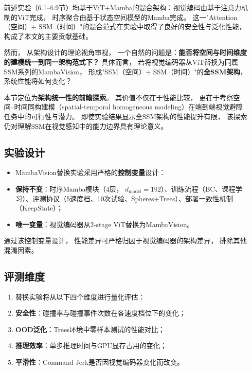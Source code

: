 前述实验（6.1--6.9节）均基于ViT+Mamba的混合架构：视觉编码由基于注意力机制的ViT完成，
时序聚合由基于状态空间模型的Mamba完成。
这一"Attention（空间）+ SSM（时间）"的混合范式在实验中取得了良好的安全性与泛化性能，
构成了本文的主要贡献基础。

然而，
从架构设计的理论视角审视，
一个自然的问题是：\textbf{能否将空间与时间维度的建模统一到同一架构范式下？
}具体而言，
若将视觉编码器从ViT替换为同属SSM系列的MambaVision\cite{Hatamizadeh2025MambaVisionCVPR}，
形成"SSM（空间）+ SSM（时间）"的\textbf{全SSM架构}，
系统性能将如何变化？

本节定位为\textbf{架构统一性的前瞻探索}。
其价值不仅在于性能比较，
更在于考察空间--时间同构建模（spatial-temporal homogeneous modeling）在端到端视觉避障任务中的可行性与潜力。
即使实验结果显示全SSM架构的性能提升有限，
该探索仍对理解SSM在视觉感知中的能力边界具有理论意义。

\subsection{实验设计}

\begin{itemize}
\item MambaVision替换实验采用严格的\textbf{控制变量}设计：
\item \textbf{保持不变}：时序Mamba模块（4层，
$d_{\text{model}}=192$）、训练流程（BC、课程学习）、评测协议（5速度档、10次试验、Spheres+Trees）、部署一致性机制（KeepState）；
 \item \textbf{唯一变量}：视觉编码器从2-stage ViT替换为MambaVision。
 \end{itemize}

通过该控制变量设计，
性能差异可严格归因于视觉编码器的架构差异，
排除其他混淆因素。

\subsection{评测维度}

\begin{enumerate}
\item 替换实验将从以下四个维度进行量化评估：
\item \textbf{安全性}：碰撞率与碰撞事件次数在各速度档位下的变化；
 \item \textbf{OOD泛化}：Trees环境中零样本测试的性能对比；
 \item \textbf{推理效率}：单步推理时间与GPU显存占用的变化；
 \item \textbf{平滑性}：Command Jerk是否因视觉编码器变化而改变。
 \end{enumerate}

